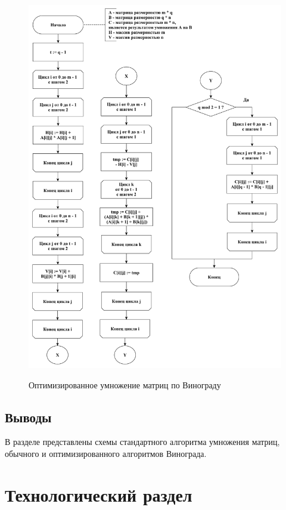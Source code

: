 \documentclass[a4paper,12pt]{article}
\begin{document}
\begin{figure}[h!]
	\begin{center}
		{\includegraphics[scale = 0.48]
			{mod_vinograd.pdf}}
		\caption{
			Оптимизированное умножение матриц по Винограду}
		\label{fig:mod_vinograd}
	\end{center}
\end{figure}

\pagebreak

\subsection*{Выводы}

В разделе представлены схемы стандартного алгоритма
умножения матриц,
обычного и оптимизированного алгоритмов Винограда.


\section{Технологический раздел}
\end{document}
